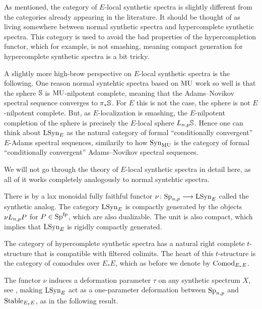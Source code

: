 \begin{remark}
    As mentioned, the category of $E$-local synthetic spectra is slightly different from the categories already appearing in the literature. It should be thought of as living somewhere between normal synthetic spectra and hypercomplete synthetic spectra. This category is used to avoid the bad properties of the hypercompletion functor, which for example, is not smashing, meaning compact generation for hypercomplete synthetic spectra is a bit tricky. 
\end{remark}

\begin{remark}
    A slightly more high-brow perspective on $E$-local synthetic spectra is the following. One reason normal syntehtic spectra based on $\MU$ work so well is that the sphere $\S$ is $\MU$-nilpotent complete, meaning that the Adams--Novikov spectral sequence converges to $\pi_*\S$. For $E$ this is not the case, the sphere is not $E$-nilpotent complete. But, as $E$-localization is smashing, the $E$-nilpotent completion of the sphere is precisely the $E$-local sphere $L\np \S$. Hence one can think about $\LSynE$ as the natural category of formal ``conditionally convergent'' $E$-Adams spectral sequences, similarily to how $\Syn_\MU$ is the category of formal ``conditionally convergent'' Adams--Novikov spectral sequences. 
\end{remark}

We will not go through the theory of $E$-local synthetic spectra in detail here, as all of it works completely analogously to normal syntehtic spectra. 

There is by \cite[4.4, 4.38]{pstragowski_2022} a lax monoidal fully faithful functor $\nu\:\Sp\np \to \LSynE$ called the synthetic analog. The category $\LSynE$ is compactly generated by the objects $\nu L\np P$ for $P\in \Sp\fp$, which are also dualizable. The unit is also compact, which implies that $\LSynE$ is rigidly compactly generated. 

The category of hypercomplete synthetic spectra has a natural right complete $t$-structure that is compatible with filtered colimits. The heart of this $t$-structure is the category of comodules over $E_{*}E$, which as before we denote by $\ComodE$. 

The functor $\nu$ induces a deformation parameter $\tau$ on any synthetic spectrum $X$, see \cite[Section 4.3]{pstragowski_2022}, making $\LSynE$ act as a one-parameter deformation between $\Sp\np$ and $\Stable\EE$, as in the following result. 

